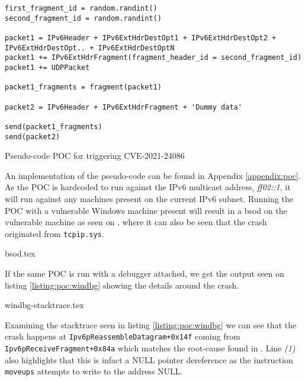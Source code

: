\documentclass{report}
\begin{document}
\begin{listing}[H]
\begin{verbatim}
first_fragment_id = random.randint()
second_fragment_id = random.randint()

packet1 = IPv6Header + IPv6ExtHdrDestOpt1 + IPv6ExtHdrDestOpt2 + IPv6ExtHdrDestOpt.. + IPv6ExtHdrDestOptN
packet1 += IPv6ExtHdrFragment(fragment_header_id = second_fragment_id)
packet1 += UDPPacket

packet1_fragments = fragment(packet1)

packet2 = IPv6Header + IPv6ExtHdrFragment + 'Dummy data'

send(packet1_fragments)
send(packet2)
\end{verbatim}
\caption{Pseudo-code \gls{POC} for triggering CVE-2021-24086}
\label{listing:poc:pseudo}
\end{listing}

An implementation of the pseudo-code can be found in Appendix \ref{appendix:poc}. As the \gls{POC} is hardcoded to run against the IPv6 multicast address, \emph{ff02::1}, it will run against any machines present on the current IPv6 subnet. Running the \gls{POC} with a vulnerable Windows machine present will result in a \gls{bsod} on the vulnerable machine as seen on , where it can also be seen that the crash originated from \texttt{tcpip.sys}.

{bsod.tex}

If the same \gls{POC} is run with a debugger attached, we get the output seen on listing \ref{listing:poc:windbg} showing the details around the crash.

{windbg-stacktrace.tex}

Examining the stacktrace seen in listing \ref{listing:poc:windbg} we can see that the crash happens at \texttt{Ipv6pReassembleDatagram+0x14f} coming from \texttt{Ipv6pReceiveFragment+0x84a} which matches the root-cause found in . Line \emph{(1)} also highlights that this is infact a NULL pointer dereference as the instruction \texttt{moveups} attempts to write to the address NULL.
\end{document}
